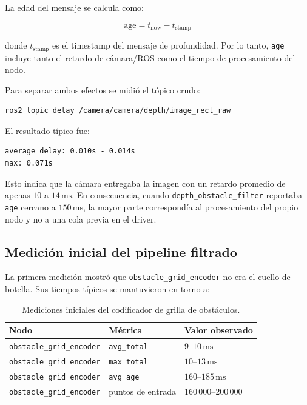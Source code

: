 La edad del mensaje se calcula como:

\begin{equation}
  \mathrm{age} = t_{\mathrm{now}} - t_{\mathrm{stamp}}
\end{equation}

donde $t_{\mathrm{stamp}}$ es el timestamp del mensaje de profundidad. Por lo
tanto, \texttt{age} incluye tanto el retardo de cámara/ROS como el tiempo de
procesamiento del nodo.

Para separar ambos efectos se midió el tópico crudo:

\begin{verbatim}
ros2 topic delay /camera/camera/depth/image_rect_raw
\end{verbatim}

El resultado típico fue:

\begin{verbatim}
average delay: 0.010s - 0.014s
max: 0.071s
\end{verbatim}

Esto indica que la cámara entregaba la imagen con un retardo promedio de apenas
$10$ a $14\,\mathrm{ms}$. En consecuencia, cuando
\texttt{depth\_obstacle\_filter} reportaba \texttt{age} cercano a
$150\,\mathrm{ms}$, la mayor parte correspondía al procesamiento del propio
nodo y no a una cola previa en el driver.

\subsection{Medición inicial del pipeline filtrado}
\label{subsec:perf-medicion-inicial}

La primera medición mostró que \texttt{obstacle\_grid\_encoder} no era el
cuello de botella. Sus tiempos típicos se mantuvieron en torno a:

\begin{table}[H]
\centering
\begin{tabular}{lll}
\toprule
\textbf{Nodo} & \textbf{Métrica} & \textbf{Valor observado} \\
\midrule
\texttt{obstacle\_grid\_encoder} & \texttt{avg\_total} & $9$--$10\,\mathrm{ms}$ \\
\texttt{obstacle\_grid\_encoder} & \texttt{max\_total} & $10$--$13\,\mathrm{ms}$ \\
\texttt{obstacle\_grid\_encoder} & \texttt{avg\_age} & $160$--$185\,\mathrm{ms}$ \\
\texttt{obstacle\_grid\_encoder} & puntos de entrada & $160\,000$--$200\,000$ \\
\bottomrule
\end{tabular}
\caption{Mediciones iniciales del codificador de grilla de obstáculos.}
\label{tab:perf-obstacle-grid-inicial}
\end{table}

